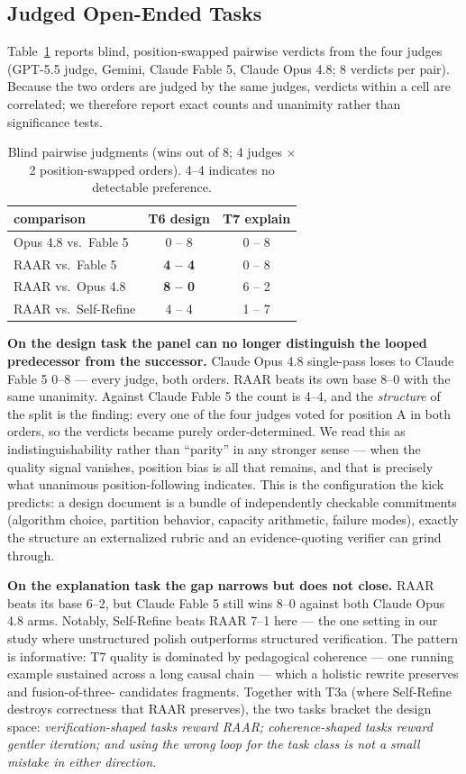 \documentclass[journal]{IEEEtran}
\newcommand{\method}{RAAR}
\newcommand{\opus}{Claude Opus 4.8}
\newcommand{\fable}{Claude Fable 5}
\newcommand{\gptjudge}{GPT-5.5 judge}
\begin{document}
\subsection{Judged Open-Ended Tasks}
\label{sec:judged-results}
Table~\ref{tab:judged} reports blind, position-swapped pairwise verdicts
from the four judges (\gptjudge{}, Gemini, \fable{}, \opus{}; 8 verdicts
per pair). Because the two orders are judged by the same judges, verdicts
within a cell are correlated; we therefore report exact counts and
unanimity rather than significance tests.

\begin{table}[t]
\caption{Blind pairwise judgments (wins out of 8; 4 judges $\times$ 2
position-swapped orders). 4--4 indicates no detectable preference.}
\label{tab:judged}
\centering
\small
\setlength{\tabcolsep}{4pt}
\begin{tabular}{lcc}
\toprule
comparison & T6 design & T7 explain \\
\midrule
Opus 4.8 vs.\ Fable 5 & 0 -- 8 & 0 -- 8 \\
\method{} vs.\ Fable 5 & \textbf{4 -- 4} & 0 -- 8 \\
\method{} vs.\ Opus 4.8 & \textbf{8 -- 0} & 6 -- 2 \\
\method{} vs.\ Self-Refine & 4 -- 4 & 1 -- 7 \\
\bottomrule
\end{tabular}
\end{table}

\textbf{On the design task the panel can no longer distinguish the looped
predecessor from the successor.} \opus{} single-pass loses to \fable{}
0--8 --- every judge, both orders. \method{} beats its own base 8--0 with
the same unanimity. Against \fable{} the count is 4--4, and the
\emph{structure} of the split is the finding: every one of the four judges
voted for position A in both orders, so the verdicts became purely
order-determined. We read this as indistinguishability rather than
``parity'' in any stronger sense --- when the quality signal vanishes,
position bias is all that remains, and that is precisely what unanimous
position-following indicates. This is the configuration the kick predicts:
a design
document is a bundle of independently checkable commitments (algorithm
choice, partition behavior, capacity arithmetic, failure modes), exactly
the structure an externalized rubric and an evidence-quoting verifier can
grind through.

\textbf{On the explanation task the gap narrows but does not close.}
\method{} beats its base 6--2, but \fable{} still wins 8--0 against both
\opus{} arms. Notably, Self-Refine beats \method{} 7--1 here --- the one
setting in our study where unstructured polish outperforms structured
verification. The pattern is informative: T7 quality is dominated by
pedagogical coherence --- one running example sustained across a long
causal chain --- which a holistic rewrite preserves and fusion-of-three-%
candidates fragments. Together with T3a (where Self-Refine destroys
correctness that \method{} preserves), the two tasks bracket the design
space: \emph{verification-shaped tasks reward \method{}; coherence-shaped
tasks reward gentler iteration; and using the wrong loop for the task class
is not a small mistake in either direction.}
\end{document}
